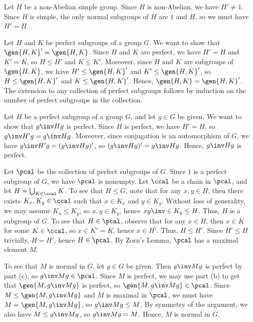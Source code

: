 \begin{solenum}
    \item Let $H$ be a non-Abelian simple group.
	Since $H$ is non-Abelian, we have $H' \neq 1$.
	Since $H$ is simple, the only normal subgroups of $H$ are $1$ and $H$, so we must have $H' = H$.
    \item Let $H$ and $K$ be perfect subgroups of a group $G$.
	We want to show that $\gen{H, K}' = \gen{H, K}$.
	Since $H$ and $K$ are perfect, we have $H' = H$ and $K' = K$, so $H \leq H'$ and $K \leq K'$.
	Moreover, since $H$ and $K$ are subgroups of $\gen{H, K}$, we have $H' \leq \gen{H, K}'$ and $K' \leq \gen{H, K}'$, so $H \leq \gen{H, K}'$ and $K \leq \gen{H, K}'$.
	Hence, $\gen{H, K} = \gen{H, K}'$.
	The extension to any collection of perfect subgroups follows by induction on the number of perfect subgroups in the collection.
    \item Let $H$ be a perfect subgroup of a group $G$, and let $g \in G$ be given.
	We want to show that $g\inv H g$ is perfect.
	Since $H$ is perfect, we have $H' = H$, so $g\inv H' g = g\inv H g$.
	Moreover, since conjugation is an automorphism of $G$, we have $g\inv H' g = (g\inv H g)'$, so $(g\inv H g)' = g\inv H g$.
	Hence, $g\inv H g$ is perfect.
    \item Let $\pcal$ be the collection of perfect subgroups of $G$.
	Since $1$ is a perfect subgroup of $G$, we have $\pcal$ is nonempty.
	Let $\ccal$ be a chain in $\pcal$, and let $H = \bigcup_{K \in \ccal} K$.
	To see that $H \leq G$, note that for any $x, y \in H$, then there exists $K_x, K_y \in \ccal$ such that $x \in K_x$ and $y \in K_y$.
	Without loss of generality, we may assume $K_x \leq K_y$, so $x, y \in K_y$, hence $xy\inv \in K_y \leq H$.
	Thus, $H$ is a subgroup of $G$.
	To see that $H \in \pcal$, observe that for any $x \in H$, then $x \in K$ for some $K \in \ccal$, so $x \in K' = K$, hence $x \in H'$.
	Thus, $H \leq H'$.
	Since $H' \leq H$ trivially, $H = H'$, hence $H \in \pcal$.
	By Zorn's Lemma, $\pcal$ has a maximal element $M$. 
    
    To see that $M$ is normal in $G$, let $g \in G$ be given.
	Then $g\inv M g$ is perfect by part (c), so $g\inv M g \in \pcal$.
	Since $M$ is perfect, we may use part (b) to get that $\gen{M, g\inv M g}$ is perfect, so $\gen{M, g\inv M g} \in \pcal$.
	Since $M \leq \gen{M, g\inv M g}$ and $M$ is maximal in $\pcal$, we must have $M = \gen{M, g\inv M g}$, so $g\inv M g \leq M$.
	By symmetry of the argument, we also have $M \leq g\inv M g$, so $g\inv M g = M$.
	Hence, $M$ is normal in $G$.
\end{solenum}

